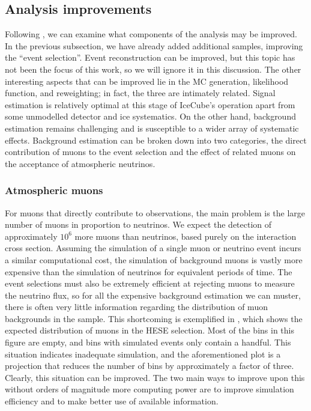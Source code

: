 \subsection{Analysis improvements}
Following , we can examine what components of the analysis may be improved.
In the previous subsection, we have already added additional samples, improving the ``event selection''.
Event reconstruction can be improved, but this topic has not been the focus of this work, so we will ignore it in this discussion.
The other interesting aspects that can be improved lie in the MC generation, likelihood function, and reweighting; in fact, the three are intimately related.
Signal estimation is relatively optimal at this stage of IceCube's operation apart from some unmodelled detector and ice systematics.
On the other hand, background estimation remains challenging and is susceptible to a wider array of systematic effects.
Background estimation can be broken down into two categories, the direct contribution of muons to the event selection and the effect of related muons on the acceptance of atmospheric neutrinos.

\subsubsection{Atmospheric muons}
For muons that directly contribute to observations, the main problem is the large number of muons in proportion to neutrinos.
We expect the detection of approximately $10^6$ more muons than neutrinos, based purely on the interaction cross section.
Assuming the simulation of a single muon or neutrino event incurs a similar computational cost, the simulation of background muons is vastly more expensive than the simulation of neutrinos for equivalent periods of time.
The event selections must also be extremely efficient at rejecting muons to measure the neutrino flux, so for all the expensive background estimation we can muster, there is often very little information regarding the distribution of muon backgrounds in the sample.
This shortcoming is exemplified in , which shows the expected distribution of muons in the HESE selection.
Most of the bins in this figure are empty, and bins with simulated events only contain a handful.
This situation indicates inadequate simulation, and the aforementioned plot is a projection that reduces the number of bins by approximately a factor of three.
Clearly, this situation can be improved.
The two main ways to improve upon this without orders of magnitude more computing power are to improve simulation efficiency and to make better use of available information.

